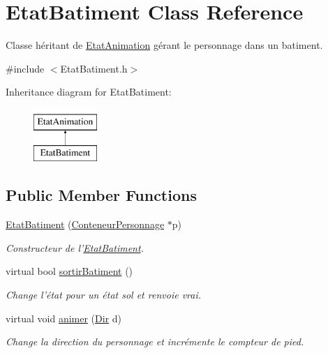 \hypertarget{classEtatBatiment}{\section{Etat\-Batiment Class Reference}
\label{classEtatBatiment}
}


Classe héritant de \hyperlink{classEtatAnimation}{Etat\-Animation} gérant le personnage dans un batiment.  




{\ttfamily \#include $<$Etat\-Batiment.\-h$>$}

Inheritance diagram for Etat\-Batiment\-:\begin{figure}[H]
\begin{center}
\leavevmode
\includegraphics[height=2.000000cm]{classEtatBatiment}
\end{center}
\end{figure}
\subsection*{Public Member Functions}
\begin{DoxyCompactItemize}
\item 
\hyperlink{classEtatBatiment_af50f0be1556e90ab1f83da33b48599d8}{Etat\-Batiment} (\hyperlink{classConteneurPersonnage}{Conteneur\-Personnage} $\ast$p)
\begin{DoxyCompactList}\small\item\em Constructeur de l'\hyperlink{classEtatBatiment}{Etat\-Batiment}. \end{DoxyCompactList}\item 
\hypertarget{classEtatBatiment_a575d38fcc6f84ba1b24627a433cd1af1}{virtual bool \hyperlink{classEtatBatiment_a575d38fcc6f84ba1b24627a433cd1af1}{sortir\-Batiment} ()}\label{classEtatBatiment_a575d38fcc6f84ba1b24627a433cd1af1}

\begin{DoxyCompactList}\small\item\em Change l'état pour un état sol et renvoie vrai. \end{DoxyCompactList}\item 
virtual void \hyperlink{classEtatBatiment_a3aae1ab9df91cc34f1fcec7970b034f5}{animer} (\hyperlink{Espace_8h_a7cf6e8c5a5bc5e7b2afef3647870b1c4}{Dir} d)
\begin{DoxyCompactList}\small\item\em Change la direction du personnage et incrémente le compteur de pied. \end{DoxyCompactList}\end{DoxyCompactItemize}
